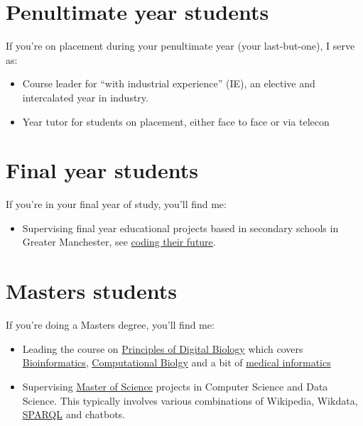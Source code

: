 \documentclass[
  12pt,
]{book}
\providecommand{\tightlist}{%
  \setlength{\itemsep}{0pt}\setlength{\parskip}{0pt}}
\begin{document}
\hypertarget{penultimate}{%
\section{Penultimate year students}\label{penultimate}}

If you're on placement during your penultimate year (your last-but-one), I serve as:

\begin{itemize}
\tightlist
\item
  Course leader for ``with industrial experience'' (IE), an elective and intercalated year in industry.
\item
  Year tutor for students on placement, either face to face or via telecon
\end{itemize}

\hypertarget{finalyear}{%
\section{Final year students}\label{finalyear}}

If you're in your final year of study, you'll find me:

\begin{itemize}
\tightlist
\item
  Supervising final year educational projects based in secondary schools in Greater Manchester, see \href{https://personalpages.manchester.ac.uk/staff/duncan.hull/coding-their-future}{coding their future}. \citep{computinged} 👩‍💻👨‍💻
\end{itemize}

\hypertarget{masters}{%
\section{Masters students}\label{masters}}

If you're doing a Masters degree, you'll find me:

\begin{itemize}
\tightlist
\item
  Leading the course on \href{http://studentnet.cs.manchester.ac.uk/pgt/COMP60532/syllabus/}{Principles of Digital Biology} which covers \href{https://en.wikipedia.org/wiki/Bioinformatics}{Bioinformatics}, \href{https://en.wikipedia.org/wiki/Computational_biology}{Computational Biolgy} and a bit of \href{https://en.wikipedia.org/wiki/Health_informatics}{medical informatics} 🧬
\item
  Supervising \href{https://www.cs.manchester.ac.uk/study/masters/}{Master of Science} projects in Computer Science and Data Science. \citep{r4ds} This typically involves various combinations of Wikipedia, Wikdata, \href{https://en.wikipedia.org/wiki/SPARQL}{SPARQL} \citep{ducharme} and chatbots. 🤖 \citep{myca}
\end{itemize}
\end{document}
